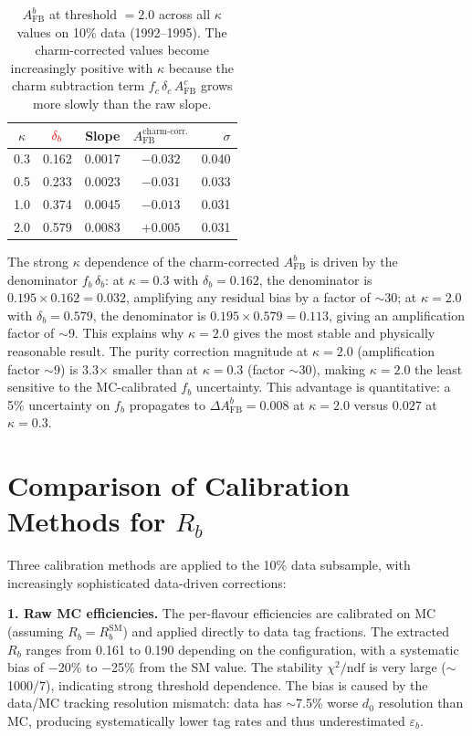 \documentclass[11pt,a4paper]{article}
\newcommand{\external}[1]{\textcolor{red}{#1}}
\begin{document}
\begin{table}[htbp]
\centering
\caption{$A_\text{FB}^b$ at threshold $= 2.0$ across all $\kappa$
values on 10\% data (1992--1995). The charm-corrected values
become increasingly positive with $\kappa$ because the charm
subtraction term $f_c\,\delta_c\,A_\text{FB}^c$ grows more slowly
than the raw slope.}
\label{tbl:afb_all_kappa_thr2}
\begin{tabular}{ccccr}
\toprule
$\kappa$ & $\external{\delta_b}$ & Slope &
$A_\text{FB}^\text{charm-corr.}$ & $\sigma$ \\
\midrule
0.3 & 0.162 & 0.0017 & $-0.032$ & 0.040 \\
0.5 & 0.233 & 0.0023 & $-0.031$ & 0.033 \\
1.0 & 0.374 & 0.0045 & $-0.013$ & 0.031 \\
2.0 & 0.579 & 0.0083 & $+0.005$ & 0.031 \\
\bottomrule
\end{tabular}
\end{table}

The strong $\kappa$ dependence of the charm-corrected
$A_\text{FB}^b$ is driven by the denominator $f_b\,\delta_b$:
at $\kappa = 0.3$ with $\delta_b = 0.162$, the denominator is
$0.195 \times 0.162 = 0.032$, amplifying any residual bias by a
factor of $\sim$30; at $\kappa = 2.0$ with $\delta_b = 0.579$,
the denominator is $0.195 \times 0.579 = 0.113$, giving an
amplification factor of $\sim$9.
This explains why $\kappa = 2.0$ gives the most stable and
physically reasonable result.
The purity correction magnitude at $\kappa = 2.0$
(amplification factor $\sim 9$) is 3.3$\times$ smaller than at
$\kappa = 0.3$ (factor $\sim 30$), making $\kappa = 2.0$ the
least sensitive to the MC-calibrated $f_b$ uncertainty.
This advantage is quantitative: a 5\% uncertainty on $f_b$
propagates to $\Delta A_\text{FB}^b = 0.008$ at $\kappa = 2.0$
versus $0.027$ at $\kappa = 0.3$.

\section{Comparison of Calibration Methods for $R_b$}
\label{app:calibration_comparison}

Three calibration methods are applied to the 10\% data subsample,
with increasingly sophisticated data-driven corrections:

\textbf{1. Raw MC efficiencies.}
The per-flavour efficiencies are calibrated on MC (assuming
$R_b = R_b^\text{SM}$) and applied directly to data tag fractions.
The extracted $R_b$ ranges from 0.161 to 0.190 depending on the
configuration, with a systematic bias of $-$20\% to $-$25\% from
the SM value.
The stability $\chi^2/\text{ndf}$ is very large ($\sim$1000/7),
indicating strong threshold dependence.
The bias is caused by the data/MC tracking resolution mismatch:
data has $\sim$7.5\% worse $d_0$ resolution than MC, producing
systematically lower tag rates and thus underestimated
$\varepsilon_b$.
\end{document}
